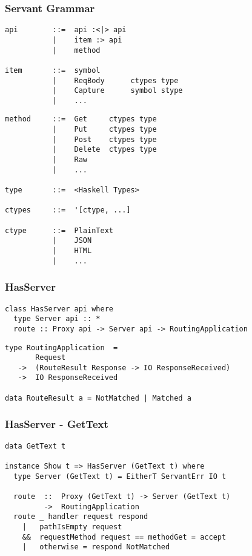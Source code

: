 \documentclass{beamer}
\begin{document}
\begin{frame}[fragile]
\frametitle{Servant Grammar}
\pause
\begin{verbatim}
api        ::=  api :<|> api
           |    item :> api
           |    method

item       ::=  symbol
           |    ReqBody      ctypes type
           |    Capture      symbol stype
           |    ...
\end{verbatim}
\end{frame}
\begin{frame}[fragile]
\begin{verbatim}
method     ::=  Get     ctypes type
           |    Put     ctypes type
           |    Post    ctypes type
           |    Delete  ctypes type
           |    Raw
           |    ...

type       ::=  <Haskell Types>

ctypes     ::=  '[ctype, ...]

ctype      ::=  PlainText
           |    JSON
           |    HTML
           |    ...
\end{verbatim}
\end{frame}

\begin{frame}[fragile]
\frametitle{HasServer}

\begin{verbatim}
class HasServer api where
  type Server api :: *
  route :: Proxy api -> Server api -> RoutingApplication
\end{verbatim}
\pause
\begin{verbatim}
type RoutingApplication  =
       Request
   ->  (RouteResult Response -> IO ResponseReceived)
   ->  IO ResponseReceived

data RouteResult a = NotMatched | Matched a
\end{verbatim}
\end{frame}

\begin{frame}[fragile]
\frametitle{HasServer - GetText}
\pause
\begin{verbatim}
data GetText t

instance Show t => HasServer (GetText t) where
  type Server (GetText t) = EitherT ServantErr IO t

  route  ::  Proxy (GetText t) -> Server (GetText t)
         ->  RoutingApplication
  route _ handler request respond
    |   pathIsEmpty request
    &&  requestMethod request == methodGet = accept
    |   otherwise = respond NotMatched
\end{verbatim}
\end{frame}
\end{document}
